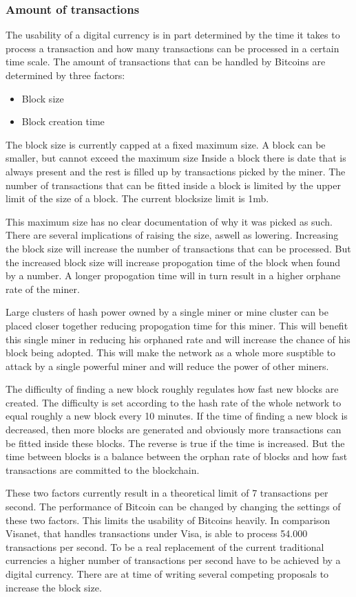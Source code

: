 \subsubsection{Amount of transactions}
The usability of a digital currency is in part determined by the time it takes to process a transaction
and how many transactions can be processed in a certain time scale.
The amount of transactions that can be handled by Bitcoins are determined by three factors:
\begin{itemize}
\item Block size
\item Block creation time
\end{itemize}

The block size is currently capped at a fixed maximum size.
A block can be smaller, but cannot exceed the maximum size
Inside a block there is date that is always present and the rest is filled up by transactions picked by the miner.
The number of transactions that can be fitted inside a block is limited by the upper limit of the size of a block.
The current blocksize limit is 1mb.

This maximum size has no clear documentation of why it was picked as such.
There are several implications of raising the size, aswell as lowering.
Increasing the block size will increase the number of transactions that can be processed.
But the increased block size will increase propogation time of the block when found by a number.
A longer propogation time will in turn result in a higher orphane rate of the miner.

Large clusters of hash power owned by a single miner or mine cluster can be placed closer together
reducing propogation time for this miner.
This will benefit this single miner in reducing his orphaned rate
and will increase the chance of his block being adopted.
This will make the network as a whole more susptible to attack by a single powerful miner
and will reduce the power of other miners.

The difficulty of finding a new block roughly regulates how fast new blocks are created.
The difficulty is set according to the hash rate of the whole network to equal roughly a new block every 10 minutes.
If the time of finding a new block is decreased,
then more blocks are generated and obviously more transactions can be fitted inside these blocks.
The reverse is true if the time is increased.
But the time between blocks is a balance between the orphan rate of blocks
and how fast transactions are committed to the blockchain.

These two factors currently result in a theoretical limit of 7 transactions per second.
The performance of Bitcoin can be changed by changing the settings of these two factors.
This limits the usability of Bitcoins heavily.
In comparison Visanet, that handles transactions under Visa, is able to process 54.000 transactions per second.
To be a real replacement of the current traditional currencies
a higher number of transactions per second have to be achieved by a digital currency.
There are at time of writing several competing proposals to increase the block size\cite{garzik-blocksize}\cite{andresen-blocksize}.

